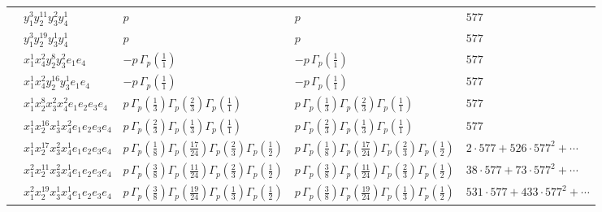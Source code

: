 \documentclass[11pt]{article}
\begin{document}
\begin{table}[ht]
{\begin{tabular}{@{}lllll@{}}
 & $y_{1}^{3} y_{2}^{11} y_{3}^{2} y_{4}^{1}$ & $p \,$ & $p \,$ & $577$ \\
 & $y_{1}^{3} y_{2}^{19} y_{3}^{1} y_{4}^{1}$ & $p \,$ & $p \,$ & $577$ \\
 & $x_{1}^{1} x_{4}^{2} y_{2}^{8} y_{3}^{2} e_{1} e_{4}$ & $- p \, \Gamma_p \left( \frac{1}{1} \right)$ & $- p \, \Gamma_p \left( \frac{1}{1} \right)$ & $577$ \\
 & $x_{1}^{1} x_{4}^{2} y_{2}^{16} y_{3}^{1} e_{1} e_{4}$ & $- p \, \Gamma_p \left( \frac{1}{1} \right)$ & $- p \, \Gamma_p \left( \frac{1}{1} \right)$ & $577$ \\
 & $x_{1}^{1} x_{2}^{8} x_{3}^{2} x_{4}^{2}  e_{1} e_{2} e_{3} e_{4}$ & $p \, \Gamma_p \left( \frac{1}{3} \right) \Gamma_p \left( \frac{2}{3} \right) \Gamma_p \left( \frac{1}{1} \right)$ & $p \, \Gamma_p \left( \frac{1}{3} \right) \Gamma_p \left( \frac{2}{3} \right) \Gamma_p \left( \frac{1}{1} \right)$ & $577$ \\
 & $x_{1}^{1} x_{2}^{16} x_{3}^{1} x_{4}^{2}  e_{1} e_{2} e_{3} e_{4}$ & $p \, \Gamma_p \left( \frac{2}{3} \right) \Gamma_p \left( \frac{1}{3} \right) \Gamma_p \left( \frac{1}{1} \right)$ & $p \, \Gamma_p \left( \frac{2}{3} \right) \Gamma_p \left( \frac{1}{3} \right) \Gamma_p \left( \frac{1}{1} \right)$ & $577$ \\
 & $x_{1}^{1} x_{2}^{17} x_{3}^{2} x_{4}^{1}  e_{1} e_{2} e_{3} e_{4}$ & $p \, \Gamma_p \left( \frac{1}{8} \right) \Gamma_p \left( \frac{17}{24} \right) \Gamma_p \left( \frac{2}{3} \right) \Gamma_p \left( \frac{1}{2} \right)$ & $p \, \Gamma_p \left( \frac{1}{8} \right) \Gamma_p \left( \frac{17}{24} \right) \Gamma_p \left( \frac{2}{3} \right) \Gamma_p \left( \frac{1}{2} \right)$ & $2{\cdot}577{+}526{\cdot}577^{2}{+}\cdots$ \\
 & $x_{1}^{2} x_{2}^{11} x_{3}^{2} x_{4}^{1}  e_{1} e_{2} e_{3} e_{4}$ & $p \, \Gamma_p \left( \frac{3}{8} \right) \Gamma_p \left( \frac{11}{24} \right) \Gamma_p \left( \frac{2}{3} \right) \Gamma_p \left( \frac{1}{2} \right)$ & $p \, \Gamma_p \left( \frac{3}{8} \right) \Gamma_p \left( \frac{11}{24} \right) \Gamma_p \left( \frac{2}{3} \right) \Gamma_p \left( \frac{1}{2} \right)$ & $38{\cdot}577{+}73{\cdot}577^{2}{+}\cdots$ \\
 & $x_{1}^{2} x_{2}^{19} x_{3}^{1} x_{4}^{1}  e_{1} e_{2} e_{3} e_{4}$ & $p \, \Gamma_p \left( \frac{3}{8} \right) \Gamma_p \left( \frac{19}{24} \right) \Gamma_p \left( \frac{1}{3} \right) \Gamma_p \left( \frac{1}{2} \right)$ & $p \, \Gamma_p \left( \frac{3}{8} \right) \Gamma_p \left( \frac{19}{24} \right) \Gamma_p \left( \frac{1}{3} \right) \Gamma_p \left( \frac{1}{2} \right)$ & $531{\cdot}577{+}433{\cdot}577^{2}{+}\cdots$ \\

\end{tabular}}
\end{table}
\end{document}
